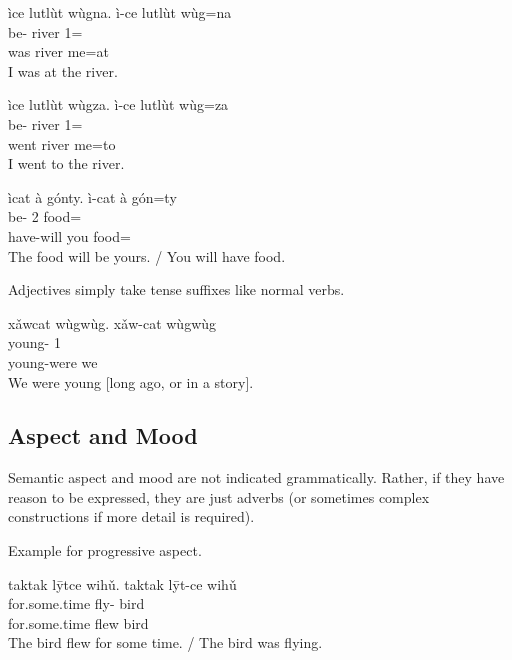 \begin{exe}
    \ex
    \glt
    ìce lutlùt wùgna.
    \glll
    ì-ce lutlùt wùg=na \\
    be-\Pst{} river 1\Sg{}=\AdessTwo{} \\
    was river me=at \\
    \glt
    I was at the river.
\end{exe}

\begin{exe}
    \ex
    \glt
    ìce lutlùt wùgza.
    \glll
    ì-ce lutlùt wùg=za \\
    be-\Pst{} river 1\Sg{}=\AllTwo{} \\
    went river me=to \\
    \glt
    I went to the river.
\end{exe}

\begin{exe}
    \ex
    \glt
    ìcat à gónty.
    \glll
    ì-cat à gón=ty \\
    be-\Fut{} 2\Sg{} food=\Poss{} \\
    have-will you food=\Poss{} \\
    \glt
    The food will be yours.
    /
    You will have food.
\end{exe}

Adjectives simply take tense suffixes like normal verbs.

\begin{exe}
    \ex
    \glt
    xǎwcat wùgwùg.
    \glll
    xǎw-cat wùgwùg \\
    young-\Hst{} 1\Pl{} \\
    young-were we \\
    \glt
    We were young [long ago, or in a story].
\end{exe}

\subsection{Aspect and Mood}\label{subsec:aspect-and-mood}
Semantic aspect and mood are not indicated grammatically.
Rather, if they have reason to be expressed, they are just adverbs
(or sometimes complex constructions if more detail is required).

Example for progressive aspect.
\begin{exe}
    \ex
    \glt
    taktak lȳtce wihǔ.
    \glll
    taktak lȳt-ce wihǔ \\
    for.some.time fly-\Pst{} bird \\
    for.some.time flew bird \\
    \glt
    The bird flew for some time.
    /
    The bird was flying.
\end{exe}

